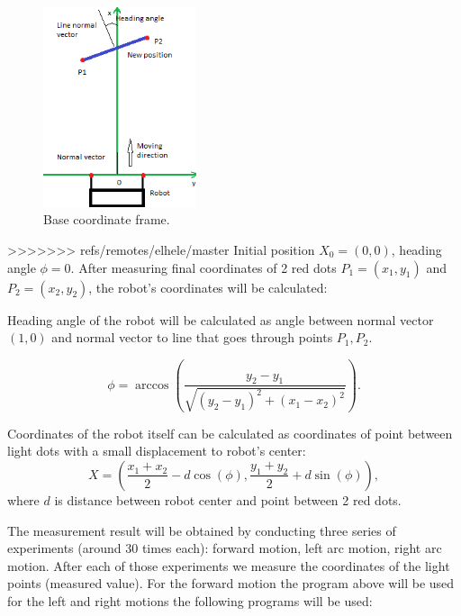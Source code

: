 \documentclass[a4paper, 12pt]{article}
\begin{document}
\begin{figure}[h]
  \centering
  \caption{Base coordinate frame.\label{fig:frame}}
  \includegraphics[width=0.4\textwidth]{frame}
\end{figure}

>>>>>>> refs/remotes/elhele/master
Initial position $X_0 = (0,0)$, heading angle $\phi = 0$. After measuring final coordinates of 2 red dots $P_1 = (x_1,y_1)$ and $P_2=(x_2,y_2)$, the robot's coordinates will be calculated:

Heading angle of the robot will be calculated as angle between normal vector $(1,0)$ and normal vector to line that goes through points $P_1,P_2.$

\begin{equation}
\phi = \arccos(\frac{y_2-y_1}{\sqrt{(y_2-y_1)^2+(x_1-x_2)^2}}).
\end{equation}

Coordinates of the robot itself can be calculated as coordinates of point between light dots with a small displacement to robot's center:
\begin{equation}
X = (\frac{x_1+x_2}{2}-d\cos(\phi),\frac{y_1+y_2}{2}+d \sin(\phi)),
\end{equation}
where $d$ is distance between robot center and point between 2 red dots.

The measurement result will be obtained by conducting three series of experiments (around 30 times each): forward motion, left arc motion, right arc motion. After each of those experiments we measure the coordinates of the light points (measured value).  For the forward motion the program above will be used for the left and right motions the following programs will be used:
\end{document}
